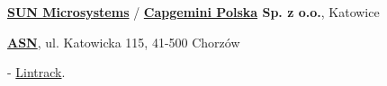 \documentclass[10pt]{article}
\newenvironment{outerlist}[1][\enskip\textbullet]%
        {\begin{itemize}[#1]}{\end{itemize}%
         \vspace{-.6\baselineskip}}
\newenvironment{innerlist}[1][\enskip\textbullet]%
        {\begin{compactitem}[#1]}{\end{compactitem}}
\newcommand{\blankline}{\quad\pagebreak[2]}
\begin{document}
\blankline

\textbf{\href{http://www.sun.com/}{SUN Microsystems} }/
\textbf{\href{http://www.capgemini.pl/}{Capgemini Polska} Sp. z o.o.}, 
Katowice
\begin{outerlist}


\item[] \textit{
}%
        \hfill \textbf{
}
\begin{innerlist}
\item
\end{innerlist}

\end{outerlist}

\blankline

\href{http://asn.pl/}{\textbf{ASN}}, 
ul. Katowicka 115, 41-500 Chorzów
\begin{outerlist}

\item[] \textit{
}%
        \hfill \textbf{
}
\begin{innerlist}
\item
\item 
\item
- \href{http://lintrack.org}{Lintrack}.
\end{innerlist}

\end{outerlist}
\end{document}
